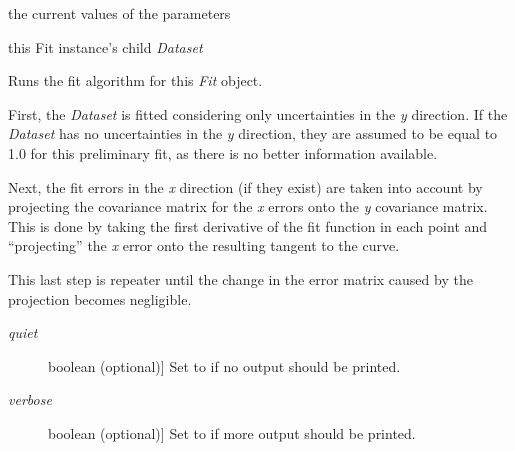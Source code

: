 \documentclass[a4paper,10pt,english]{sphinxmanual}
\begin{document}
\begin{fulllineitems}
\begin{fulllineitems}
\end{fulllineitems}


\begin{fulllineitems}
\label{index:kafe.fit.Fit.current_param_values}
the current values of the parameters

\end{fulllineitems}


\begin{fulllineitems}
\label{index:kafe.fit.Fit.dataset}
this Fit instance's child \emph{Dataset}

\end{fulllineitems}


\begin{fulllineitems}
\label{index:kafe.fit.Fit.do_fit}
Runs the fit algorithm for this \emph{Fit} object.

First, the \emph{Dataset} is fitted considering only uncertainties in the \emph{y} direction.
If the \emph{Dataset} has no uncertainties in the \emph{y} direction, they are assumed to be 
equal to 1.0 for this preliminary fit, as there is no better information available.

Next, the fit errors in the \emph{x} direction (if they exist) are taken into account by
projecting the covariance matrix for the \emph{x} errors onto the \emph{y} covariance matrix.
This is done by taking the first derivative of the fit function in each point and
``projecting'' the \emph{x} error onto the resulting tangent to the curve.

This last step is repeater until the change in the error matrix caused by the projection
becomes negligible.
\begin{description}
\item[{\emph{quiet}}] \leavevmode{[}boolean (optional){]}
Set to  if no output should be printed.

\item[{\emph{verbose}}] \leavevmode{[}boolean (optional){]}
Set to  if more output should be printed.

\end{description}


\end{fulllineitems}
\end{fulllineitems}
\end{document}
